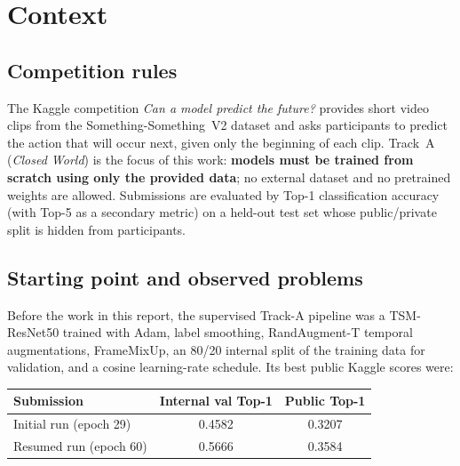 %

\renewcommand{\trackcolor}{trackred}
\renewcommand{\trackname}{Track~A}

\section{Context}
\label{sec:context}

\subsection{Competition rules}

The Kaggle competition \emph{Can a model predict the future?} provides
short video clips from the Something-Something~V2 dataset and asks
participants to predict the action that will occur next, given only the
beginning of each clip. Track~A (\emph{Closed World}) is the focus of this
work: \textbf{models must be trained from scratch using only the provided
data}; no external dataset and no pretrained weights are allowed.
Submissions are evaluated by Top-1 classification accuracy (with Top-5 as
a secondary metric) on a held-out test set whose public/private split is
hidden from participants.

\subsection{Starting point and observed problems}

Before the work in this report, the supervised Track-A pipeline was a
TSM-ResNet50 trained with Adam, label smoothing, RandAugment-T temporal
augmentations, FrameMixUp, an 80/20 internal split of the training data
for validation, and a cosine learning-rate schedule. Its best public
Kaggle scores were:

\begin{center}
\begin{tabular}{lcc}
\toprule
\textbf{Submission} & \textbf{Internal val Top-1} & \textbf{Public Top-1} \\
\midrule
Initial run (epoch 29) & 0.4582 & 0.3207 \\
Resumed run (epoch 60) & 0.5666 & 0.3584 \\
\bottomrule
\end{tabular}
\end{center}

